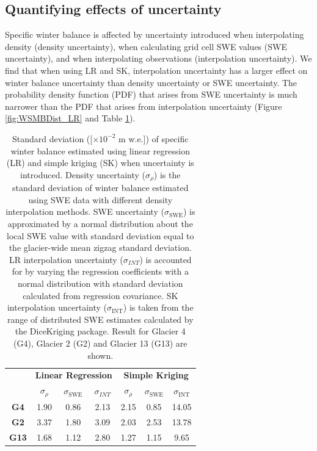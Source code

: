 \documentclass[twocolumn, letterpaper]{igs}
\begin{document}
\subsection{Quantifying effects of uncertainty}

Specific winter balance is affected by uncertainty introduced when interpolating density (density uncertainty), when calculating grid cell SWE values (SWE uncertainty), and when interpolating observations (interpolation uncertainty). We find that when using LR and SK, interpolation uncertainty has a larger effect on winter balance uncertainty than density uncertainty or SWE uncertainty. The probability density function (PDF) that arises from SWE uncertainty is much narrower than the PDF that arises from interpolation uncertainty (Figure \ref{fig:WSMBDist_LR} and Table \ref{tab:WSMBdistribution_sigma}).

 \begin{table}[]
\centering
\caption{Standard deviation ([$\times10^{-2}$ m w.e.]) of specific winter balance estimated using linear regression (LR) and simple kriging (SK) when uncertainty is introduced. Density uncertainty ($\sigma_{\rho}$) is the standard deviation of winter balance estimated using SWE data with different density interpolation methods. SWE uncertainty ($\sigma_{\mathrm{SWE}}$) is approximated by a normal distribution about the local SWE value with standard deviation equal to the glacier-wide mean zigzag standard deviation. LR interpolation uncertainty ($\sigma_{INT}$) is accounted for by varying the regression coefficients with a normal distribution with standard deviation calculated from regression covariance. SK interpolation uncertainty ($\sigma_{\mathrm{INT}}$) is taken from the range of distributed SWE estimates calculated by the DiceKriging package. Result for Glacier 4 (G4), Glacier 2 (G2) and Glacier 13 (G13) are shown.}
\label{tab:WSMBdistribution_sigma}
\begin{tabular}{ccccccc}
\textbf{} & \multicolumn{3}{c}{\textbf{Linear Regression}} & \multicolumn{3}{c}{\textbf{Simple Kriging}} \\
 & $\sigma_{\rho}$ & $\sigma_{\mathrm{SWE}}$ & $\sigma_{INT}$ & $\sigma_{\rho}$ & $\sigma_{\mathrm{SWE}}$ & $\sigma_{\mathrm{INT}}$ \\
\midrule
\textbf{G4} & 1.90 & 0.86 & 2.13 & 2.15 & 0.85 & 14.05 \\
\textbf{G2} &3.37 & 1.80 & 3.09 & 2.03 & 2.53 & 13.78 \\
\textbf{G13} & 1.68 & 1.12 & 2.80 & 1.27 & 1.15 & 9.65
\end{tabular}
\end{table}
\end{document}
